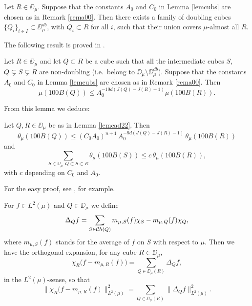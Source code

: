 \begin{lemma}\label{lemcobdob}
	Let $R\in\DD_\mu$. Suppose that the constants $A_0$ and $C_0$ in Lemma \ref{lemcubs} are
	chosen as in Remark \ref{rema00}. Then there exists a family of
	doubling cubes $\{Q_i\}_{i\in I}\subset \DD_\mu^{db}$, with
	$Q_i\subset R$ for all $i$, such that their union covers $\mu$-almost all $R$.
\end{lemma}

The following result is proved in \cite[Lemma 5.31]{David-Mattila}.
\vv

\begin{lemma}\label{lemcad22}
	Let $R\in\DD_\mu$ and let $Q\subset R$ be a cube such that all the intermediate cubes $S$,
	$Q\subsetneq S\subsetneq R$ are non-doubling (i.e.\ belong to $\DD_\mu\setminus \DD_\mu^{db}$).
	Suppose that the constants $A_0$ and $C_0$ in Lemma \ref{lemcubs} are
	chosen as in Remark \ref{rema00}. 
	Then
	\begin{equation}\label{eqdk88}
		\mu(100B(Q))\leq A_0^{-10d(J(Q)-J(R)-1)}\mu(100B(R)).
	\end{equation}
\end{lemma}
\vv


From this lemma we deduce:

\vv
\begin{lemma}\label{lemcad23}
	Let $Q,R\in\DD_\mu$ be as in Lemma \ref{lemcad22}.
	Then
	$$\theta_\mu(100B(Q))\leq (C_0A_0)^{n+1}\,A_0^{-9d(J(Q)-J(R)-1)}\,\theta_\mu(100B(R))$$
	and
	$$\sum_{S\in\DD_\mu:Q\subset S\subset R}\theta_\mu(100B(S))\leq c\,\theta_\mu(100B(R)),$$
	with $c$ depending on $C_0$ and $A_0$.
\end{lemma}

For the easy proof, see
\cite[Lemma 4.4]{Tolsa-memo}, for example.

For $f\in L^2(\mu)$ and $Q\in\DD_\mu$ we define
\begin{equation}\label{eqdq1}
	\Delta_Q f=\sum_{S\in{\mathcal Ch}(Q)}m_{\mu,S}(f)\chi_S-m_{\mu,Q}(f)\chi_Q,
\end{equation}
where $m_{\mu,S}(f)$ stands for the average of $f$ on $S$ with respect to $\mu$.
Then we have the orthogonal expansion, for any cube $R\in\DD_\mu$,
$$\chi_{R} \bigl(f - m_{\mu,R}(f)\bigr) = \sum_{Q\in\DD_\mu(R)}\Delta_Q f,$$
in the $L^2(\mu)$-sense, so that
$$\|\chi_{R} \bigl(f - m_{\mu,R}(f)\|_{L^2(\mu)}^2 = \sum_{Q\in\DD_\mu(R)}\|\Delta_Q f\|_{L^2(\mu)}^2.$$

